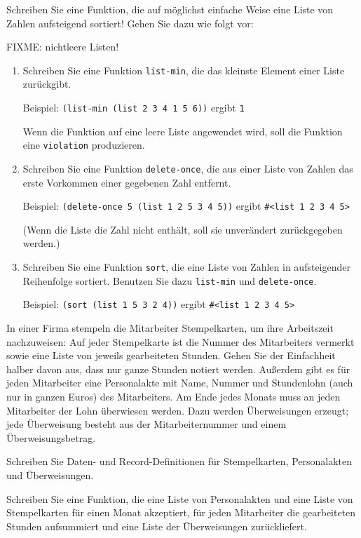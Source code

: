 \begin{aufgabe}
   Schreiben Sie eine Funktion, die auf möglichst
  einfache Weise eine Liste von Zahlen aufsteigend sortiert! Gehen
  Sie dazu wie folgt vor:

  FIXME: nichtleere Listen!
  
  \begin{enumerate}
  \item Schreiben Sie eine Funktion
    \texttt{list-min}, die das kleinste Element einer
    Liste zurückgibt.

    Beispiel: \verb|(list-min (list 2 3 4 1 5 6))| ergibt \verb|1|

    Wenn die Funktion auf eine leere Liste angewendet
    wird, soll die Funktion eine \texttt{violation} produzieren.
  \item Schreiben Sie eine Funktion
    \texttt{delete-once}, die aus einer Liste von Zahlen das erste
    Vorkommen einer gegebenen Zahl entfernt.

    Beispiel: \verb|(delete-once 5 (list 1 2 5 3 4 5))| ergibt
    \verb|#<list 1 2 3 4 5>|
    
    (Wenn die Liste die Zahl nicht enthält,
    soll sie unverändert zurückgegeben werden.)
  \item  Schreiben Sie eine Funktion \texttt{sort}, die
    eine Liste von Zahlen in aufsteigender Reihenfolge sortiert.
    Benutzen Sie dazu \texttt{list-min} und \texttt{delete-once}.

    Beispiel: \verb|(sort (list 1 5 3 2 4))| ergibt
    \verb|#<list 1 2 3 4 5>|

  \end{enumerate}
\end{aufgabe}

\begin{aufgabe}
   In einer Firma stempeln die Mitarbeiter Stempelkarten, um ihre
  Arbeitszeit nachzuweisen: Auf jeder Stempelkarte ist die Nummer des
  Mitarbeiters vermerkt sowie eine Liste von jeweils gearbeiteten
  Stunden. Gehen Sie der Einfachheit halber davon aus, dass nur ganze Stunden
  notiert werden.
  Außerdem gibt es für jeden Mitarbeiter eine Personalakte
  mit Name, Nummer und Stundenlohn (auch nur in ganzen Euros) des Mitarbeiters.
  Am Ende jedes Monats 
  muss an jeden Mitarbeiter der Lohn überwiesen werden.  Dazu werden
  Überweisungen erzeugt; jede Überweisung besteht aus der
  Mitarbeiternummer und einem Überweisungsbetrag.

  Schreiben Sie Daten- und Record-Definitionen für Stempelkarten,
  Personalakten und Überweisungen.

  Schreiben Sie eine Funktion, die eine Liste von Personalakten
  und eine Liste von Stempelkarten für einen Monat akzeptiert, für jeden
  Mitarbeiter die gearbeiteten Stunden aufsummiert und eine
  Liste der Überweisungen zurückliefert.
\end{aufgabe}

